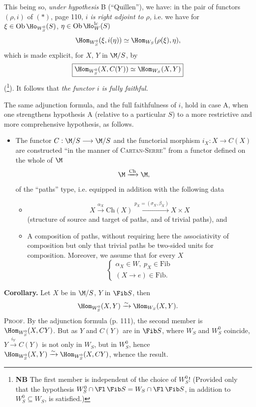 This being so, \textit{under hypothesis} B (``Quillen''), we have: in the pair of functors $(\rho, i)$ of $(*)$, page 110, \textit{$i$ is right adjoint to $\rho$,} i.e. we have for $\xi \in \mathrm{Ob}\,\Ho_{W_S^0}(S)$, $\eta \in \mathrm{Ob}\,\Ho^{\mathrm{lc}}_W(S)$
\[\Hom_{W_S^0}(\xi, i(\eta)) \simeq \Hom_{W_S}(\rho(\xi), \eta),\]
which is made explicit, for $X$, $Y$ in $\M/S$, by
\[\boxed{\Hom_{W_S^0}(X, C(Y)) \simeq \Hom_{W_S}(X, Y)}\]
(\footnote{\textbf{NB} The first member is independent of the choice of $W_S^0$! (Provided only that the hypothesis $W_S^0 \cap \Fl\,\Fib S = W_S \cap \Fl\,\Fib S$, in addition to $W_S^0 \subseteq W_S$, is satisfied.)}). It follows that \textit{the functor $i$ is fully faithful.}

The same adjunction formula, and the
full faithfulness of $i$, hold in case A, when one strengthens hypothesis A (relative to a particular $S$) to a more restrictive and more comprehensive hypothesis, as follows.

\begin{itemize}[leftmargin=3em]
\item[A$'$)] The functor $C : \M/S \longrightarrow \M/S$ and the functorial morphism $i_X : X \longrightarrow C(X)$ are constructed ``in the manner of \textsc{Cartan-Serre}'' from a functor defined on the whole of $\M$
\[\M \xrightarrow{\mathrm{Ch}} \M,\]
of the ``paths'' type, i.e. equipped in addition with the following data
\begin{itemize}[leftmargin=3em]
\item[a)] \[X \xrightarrow{\alpha_X} \mathrm{Ch}(X) \xrightarrow{p_X = (\sigma_X, \beta_X)} X \times X\]
(structure of source and target of paths, and of trivial paths), and
\item[b)] A composition of paths, without requiring here the associativity of composition but only that trivial paths be two-sided units for composition. Moreover, we assume that for every $X$ %
\[\begin{cases} \alpha_X \in W,\ p_X \in \mathrm{Fib} \\ (X \longrightarrow e) \in \mathrm{Fib}. \end{cases}\]
\end{itemize}
\end{itemize}

\textbf{Corollary.} Let $X$ be in $\M/S$, $Y$ in $\Fib S$, then
\[\Hom_{W_S^0}(X, Y) \xrightarrow{\sim} \Hom_{W_S}(X, Y).\]
\textsc{Proof}. By the adjunction formula (p. 111), the second member is $\Hom_{W_S^0}(X, CY)$. But as $Y$ and $C(Y)$ are in $\Fib S$, where $W_S$ and $W_S^0$ coincide, $Y \xrightarrow{i_Y} C(Y)$ is not only in $W_S$, but in $W_S^0$, hence $\Hom_{W_S^0}(X, Y) \xrightarrow{\sim} \Hom_{W_S^0}(X, CY)$, whence the result.

